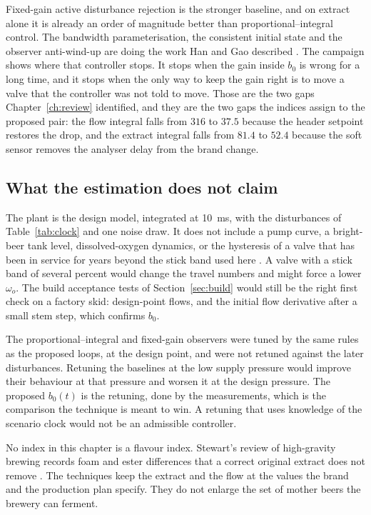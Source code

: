 Fixed-gain active disturbance rejection is the stronger baseline, and on extract alone it is already an order of magnitude better than proportional--integral control. The bandwidth parameterisation, the consistent initial state and the observer anti-wind-up are doing the work Han and Gao described \cite{han2009pid,gao2003scaling,herbst2013simulative}. The campaign shows where that controller stops. It stops when the gain inside $b_0$ is wrong for a long time, and it stops when the only way to keep the gain right is to move a valve that the controller was not told to move. Those are the two gaps Chapter~\ref{ch:review} identified, and they are the two gaps the indices assign to the proposed pair: the flow integral falls from $316$ to $37.5$ because the header setpoint restores the drop, and the extract integral falls from $81.4$ to $52.4$ because the soft sensor removes the analyser delay from the brand change.

\subsection{What the estimation does not claim}

The plant is the design model, integrated at \SI{10}{ms}, with the disturbances of Table~\ref{tab:clock} and one noise draw. It does not include a pump curve, a bright-beer tank level, dissolved-oxygen dynamics, or the hysteresis of a valve that has been in service for years beyond the stick band used here \cite{choudhury2008stiction,jelali2010stiction}. A valve with a stick band of several percent would change the travel numbers and might force a lower $\omega_o$. The build acceptance tests of Section~\ref{sec:build} would still be the right first check on a factory skid: design-point flows, and the initial flow derivative after a small stem step, which confirms $b_0$.

The proportional--integral and fixed-gain observers were tuned by the same rules as the proposed loops, at the design point, and were not retuned against the later disturbances. Retuning the baselines at the low supply pressure would improve their behaviour at that pressure and worsen it at the design pressure. The proposed $b_0(t)$ is the retuning, done by the measurements, which is the comparison the technique is meant to win. A retuning that uses knowledge of the scenario clock would not be an admissible controller.

No index in this chapter is a flavour index. Stewart's review of high-gravity brewing records foam and ester differences that a correct original extract does not remove \cite{stewart2010highgravity,briggs2004brewing,boulton2001yeast}. The techniques keep the extract and the flow at the values the brand and the production plan specify. They do not enlarge the set of mother beers the brewery can ferment.

